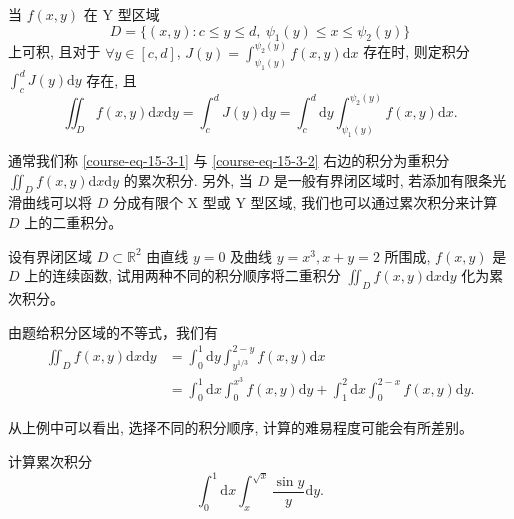 \documentclass[12pt,fontset=fandol]{ctexart}
\begin{document}
\begin{remark}\quad 当 $f(x,y)$ 在 Y 型区域
\[
  D=\{(x,y):c\leqslant y\leqslant d,\ \psi_1(y)\leqslant x\leqslant\psi_2(y)\}
\]
上可积, 且对于 $\forall y\in[c,d]$, $J(y)=\int_{\psi_1(y)}^{\psi_2(y)}f(x,y)\mathrm dx$ 存在时, 则定积分 $\int_c^dJ(y)\mathrm dy$ 存在, 且
\begin{equation}
  \iint_D f(x,y)\mathrm dx\mathrm dy
  =\int_c^dJ(y)\mathrm dy
  =\int_c^d\mathrm dy\int_{\psi_1(y)}^{\psi_2(y)}f(x,y)\mathrm dx.
  \label{course-eq-15-3-2}
\end{equation}

通常我们称 \eqref{course-eq-15-3-1}  与 \eqref{course-eq-15-3-2}  右边的积分为重积分 $\iint_D f(x,y)\mathrm dx\mathrm dy$ 的累次积分. 另外, 当 $D$ 是一般有界闭区域时, 若添加有限条光滑曲线可以将 $D$ 分成有限个 X 型或 Y 型区域, 我们也可以通过累次积分来计算 $D$ 上的二重积分。

\end{remark}
\begin{example}\label{course-example-15-3-2}\quad 设有界闭区域 $D\subset\mathbb R^2$ 由直线 $y=0$ 及曲线 $y=x^3,x+y=2$ 所围成, $f(x,y)$ 是 $D$ 上的连续函数, 试用两种不同的积分顺序将二重积分 $\iint_D f(x,y)\mathrm dx\mathrm dy$ 化为累次积分。

\end{example}
\begin{solve}\quad 由题给积分区域的不等式，我们有
\[
\begin{aligned}
  \iint_D f(x,y)\mathrm dx\mathrm dy
  &=\int_0^1\mathrm dy\int_{y^{1/3}}^{2-y}f(x,y)\mathrm dx\\
  &=\int_0^1\mathrm dx\int_0^{x^3}f(x,y)\mathrm dy
    +\int_1^2\mathrm dx\int_0^{2-x}f(x,y)\mathrm dy.
\end{aligned}
\]

从上例中可以看出, 选择不同的积分顺序, 计算的难易程度可能会有所差别。

\end{solve}
\begin{example}\label{course-example-15-3-3}\quad 计算累次积分
\[
  \int_0^1\mathrm dx\int_x^{\sqrt x}\frac{\sin y}{y}\mathrm dy.
\]

\end{example}
\end{document}
